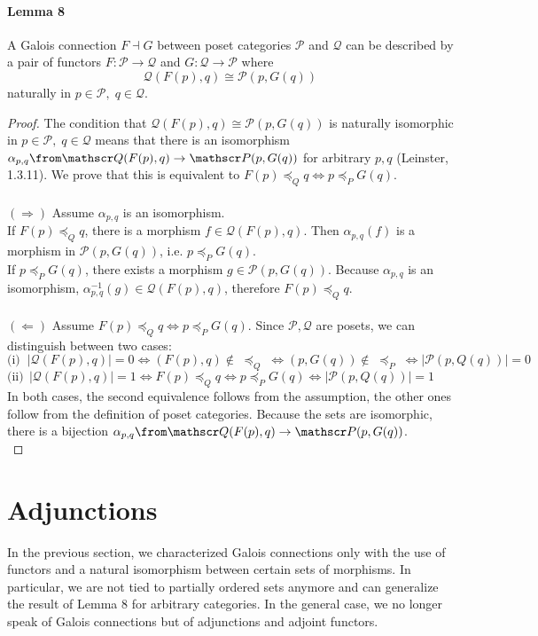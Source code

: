 \paragraph{Lemma 8} 
	A Galois connection $F \dashv G$ between poset categories $\mathcal{P}$ and $\mathcal{Q}$ can be described by a pair of functors $F : \mathscr P \rightarrow \mathscr Q$ and $G : \mathscr Q \rightarrow \mathscr P$ where
	\[\mathscr Q(F(p), q) \cong \mathscr P(p, G(q))\]
	naturally in $p \in \mathscr P, \; q \in \mathscr Q$. 
	\\
\begin{proof}
	The condition that $ \mathscr Q(F(p), q) \cong \mathscr P(p, G(q))$ 
	 is naturally isomorphic in $p \in \mathscr P, \; q \in \mathscr Q$ means that there is an isomorphism $\alpha _{p,q} \from \mathscr Q(F(p), q) \to \mathscr P(p, G(q))$ for arbitrary $p, q$ (Leinster, 1.3.11). We prove that this is equivalent to $F(p) \preceq_Q  q \Leftrightarrow p \preceq_P G(q)$. 
	 \\\\
	$(\Rightarrow)$ Assume $\alpha _{p, q}$ is an isomorphism.
	\\
	If $F(p) \preceq_Q  q$, there is a morphism $f \in  \mathscr Q(F(p), q)$. Then $\alpha _{p, q}(f)$ is a morphism in $\mathscr P(p, G(q))$, i.e. $p \preceq_P G(q)$. 
	\\
	If $p \preceq_P G(q)$, there exists a morphism $g \in \mathscr P(p, G(q))$. Because $\alpha _{p, q}$ is an isomorphism,  $\alpha^{-1} _{p,q} (g) \in  \mathscr Q(F(p), q)$, therefore $F(p) \preceq_Q  q$.
	\\\\
	$(\Leftarrow)$
	Assume $F(p) \preceq_Q q \Leftrightarrow p \preceq_P G(q)$. Since $\mathscr{P}, \mathscr{Q}$ are posets, we can distinguish between two cases: 
	 \[\text{(i)} \;\;|\mathscr Q(F(p), q)| =0 \Leftrightarrow (F(p), q) \notin \; \preceq_Q \; \Leftrightarrow (p, G(q)) \notin \; \preceq_P \; \Leftrightarrow |\mathscr P(p, Q(q))| = 0\]
	 \[\text{(ii)} \;\,|\mathscr Q(F(p), q)| = 1 \Leftrightarrow F(p) \preceq_Q q \Leftrightarrow p \preceq_P G(q) \Leftrightarrow |\mathscr P(p, Q(q))| = 1\;\;\;\;\;\;\;\;\;\;\;\;\;\;\]
	 In both cases, the second equivalence follows from the assumption, the other ones follow from the definition of poset categories. Because the sets are isomorphic, there is a bijection $\alpha_{p,q} \from \mathscr Q(F(p), q) \to \mathscr P(p, G(q))$.
	 \\
\end{proof}
	
\section*{Adjunctions}
	In the previous section, we characterized Galois connections only with the use of functors and a natural isomorphism between certain sets of morphisms. In particular, we are not tied to partially ordered sets anymore and can generalize the result of Lemma 8 for arbitrary categories. In the general case, we no longer speak of Galois connections but of adjunctions and adjoint functors.\\
